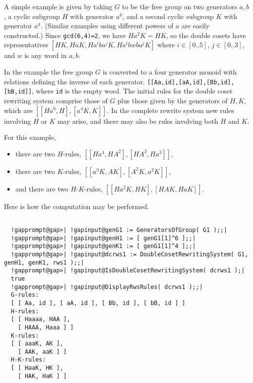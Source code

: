 \documentclass[a4paper,11pt]{report}
\begin{document}
{{{ A simple example is given by taking $G$ to be the free group on two generators $a,b$, a cyclic subgroup $H$ with generator $a^6$, and a second cyclic subgroup $K$ with generator $a^4$. (Similar examples using different powers of $a$ are easily constructed.) Since \texttt{gcd(6,4)=2}, we have $Ha^2K=HK$, so the double cosets have representatives $[HK, HaK, Ha^iba^jK, Ha^ibwba^jK]$ where $i \in [0..5]$, $j \in [0..3]$, and $w$ is any word in $a,b$. 

 In the example the free group $G$ is converted to a four generator monoid with relations defining the inverse of
each generator, \texttt{[[Aa,id],[aA,id],[Bb,id],[bB,id]]}, where \texttt{id} is the empty word. The initial rules for the double coset rewriting system
comprise those of $G$ plus those given by the generators of $H,K$, which are $[[Ha^6,H],[a^4K,K]]$. In the complete rewrite system new rules involving $H$ or $K$ may arise, and there may also be rules involving both $H$ and $K$. 

 For this example, 
\begin{itemize}
\item  there are two $H$-rules, $[[Ha^4,HA^2],[HA^3,Ha^3]]$, 
\item  there are two $K$-rules, $[[a^3K,AK],[A^2K,a^2K]]$, 
\item  and there are two $H$-$K$-rules, $[[Ha^2K,HK],[HAK,HaK]]$. 
\end{itemize}
 Here is how the computation may be performed. }

 
\begin{Verbatim}[commandchars=!@|,fontsize=\small,frame=single,label=Example]
  
  !gapprompt@gap>| !gapinput@genG1 := GeneratorsOfGroup( G1 );;|
  !gapprompt@gap>| !gapinput@genH1 := [ genG1[1]^6 ];;|
  !gapprompt@gap>| !gapinput@genK1 := [ genG1[1]^4 ];;|
  !gapprompt@gap>| !gapinput@dcrws1 := DoubleCosetRewritingSystem( G1, genH1, genK1, rws1 );;|
  !gapprompt@gap>| !gapinput@IsDoubleCosetRewritingSystem( dcrws1 );|
  true
  !gapprompt@gap>| !gapinput@DisplayRwsRules( dcrws1 );;|
  G-rules:
  [ [ Aa, id ], [ aA, id ], [ Bb, id ], [ bB, id ] ]
  H-rules:
  [ [ Haaaa, HAA ],
    [ HAAA, Haaa ] ]
  K-rules:
  [ [ aaaK, AK ],
    [ AAK, aaK ] ]
  H-K-rules:
  [ [ HaaK, HK ],
    [ HAK, HaK ] ]
  
\end{Verbatim}
 

}}
\end{document}
